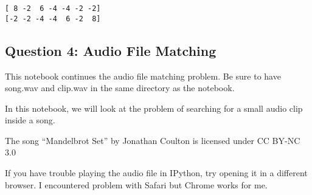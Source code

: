 \documentclass[11pt]{article}
\begin{document}
    \begin{Verbatim}[commandchars=\\\{\}]
[ 8 -2  6 -4 -4 -2 -2]
[-2 -2 -4 -4  6 -2  8]
\end{Verbatim}

    \hypertarget{question-4-audio-file-matching}{%
\subsection{Question 4: Audio File
Matching}\label{question-4-audio-file-matching}}

This notebook continues the audio file matching problem. Be sure to have
song.wav and clip.wav in the same directory as the notebook.

In this notebook, we will look at the problem of searching for a small
audio clip inside a song.

The song ``Mandelbrot Set'' by Jonathan Coulton is licensed under CC
BY-NC 3.0

If you have trouble playing the audio file in IPython, try opening it in
a different browser. I encountered problem with Safari but Chrome works
for me.
\end{document}
